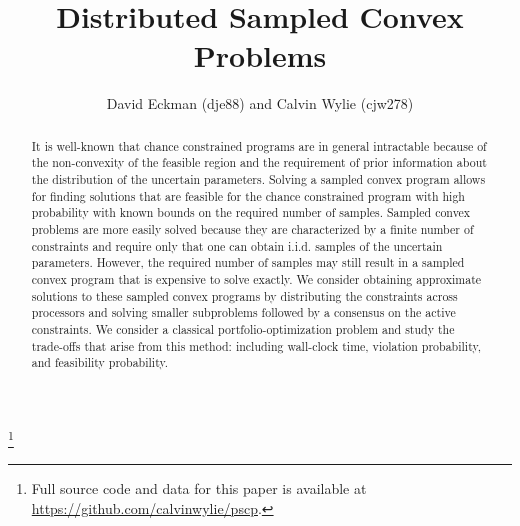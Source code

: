 \documentclass[12pt]{article}
\title{Distributed Sampled Convex Problems}
\author{David Eckman (dje88) and Calvin Wylie (cjw278)}
\date{}
\newcommand\blfootnote[1]{%
  \begingroup
  \renewcommand\thefootnote{}\footnote{#1}%
  \addtocounter{footnote}{-1}%
  \endgroup
}
\begin{document}
\setlength{\parindent}{24pt}

\maketitle

\begin{abstract}
It is well-known that chance constrained programs are in general intractable because of the non-convexity of the feasible region and the requirement of prior information about the distribution of the uncertain parameters.
Solving a sampled convex program allows for finding solutions that are feasible for the chance constrained program with high probability with known bounds on the required number of samples.
Sampled convex problems are more easily solved because they are characterized by a finite number of constraints and require only that one can obtain i.i.d. samples of the uncertain parameters.
However, the required number of samples may still result in a sampled convex program that is expensive to solve exactly.
We consider obtaining approximate solutions to these sampled convex programs by distributing the constraints across processors and solving smaller subproblems followed by a consensus on the active constraints.
We consider a classical portfolio-optimization problem and study the trade-offs that arise from this method: including wall-clock time, violation probability, and feasibility probability.
\end{abstract}

\blfootnote{Full source code and data for this paper is available at \url{https://github.com/calvinwylie/pscp}.}
\end{document}
